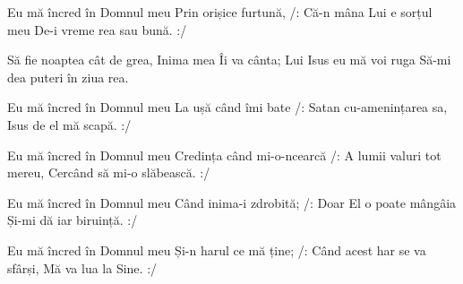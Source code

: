 \beginverse
Eu mă încred în Domnul meu
Prin orișice furtună,
/: Că-n mâna Lui e sorțul meu
De-i vreme rea sau bună. :/
\endverse

\beginchorus
Să fie noaptea cât de grea,
Inima mea Îi va cânta;
Lui Isus eu mă voi ruga
Să-mi dea puteri în ziua rea.
\endchorus

\beginverse
Eu mă încred în Domnul meu
La ușă când îmi bate
/: Satan cu-amenințarea sa,
Isus de el mă scapă. :/
\endverse

\beginverse
Eu mă încred în Domnul meu
Credința când mi-o-ncearcă
/: A lumii valuri tot mereu,
Cercând să mi-o slăbească. :/
\endverse

\beginverse
Eu mă încred în Domnul meu
Când inima-i zdrobită;
/: Doar El o poate mângâia
Și-mi dă iar biruință. :/
\endverse

\beginverse
Eu mă încred în Domnul meu
Și-n harul ce mă ține;
/: Când acest har se va sfârși,
Mă va lua la Sine. :/
\endverse
\endsong